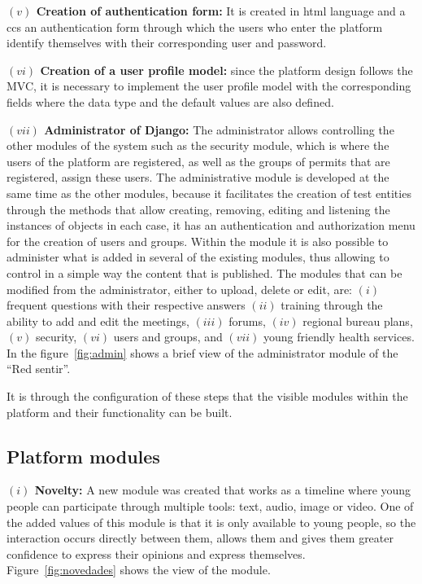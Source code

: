 \documentclass[journal,transmag]{IEEEtran}
\begin{document}
\textbf{$(v)$ Creation of authentication form:} It is created in html language and a ccs an authentication form through which the users who enter the platform identify themselves with their corresponding user and password.

\textbf{$(vi)$ Creation of a user profile model:} since the platform design follows the MVC, it is necessary to implement the user profile model with the corresponding fields where the data type and the default values are also defined.

\textbf{$(vii)$ Administrator of Django:} The administrator allows controlling the other modules of the system such as the security module, which is where the users of the platform are registered, as well as the groups of permits that are registered, assign these users. The administrative module is developed at the same time as the other modules, because it facilitates the creation of test entities through the methods that allow creating, removing, editing and listening the instances of objects in each case, it has an authentication and authorization menu for the creation of users and groups. Within the module it is also possible to administer what is added in several of the existing modules, thus allowing to control in a simple way the content that is published. The modules that can be modified from the administrator, either to upload, delete or edit, are: $(i)$ frequent questions with their respective answers $(ii)$ training through the ability to add and edit the meetings, $(iii)$ forums, $(iv)$ regional bureau plans, $(v)$ security, $(vi)$ users and groups, and $(vii)$ young friendly health services. In the figure~\ref{fig:admin} shows a brief view of the administrator module of the “Red sentir”.

It is through the configuration of these steps that the visible modules within the platform and their functionality can be built.

\subsection{Platform modules}

\textbf{$(i)$ Novelty:} A new module was created that works as a timeline where young people can participate through multiple tools: text, audio, image or video. One of the added values of this module is that it is only available to young people, so the interaction occurs directly between them, allows them and gives them greater confidence to express their opinions and express themselves. Figure~\ref{fig:novedades} shows the view of the module.
\end{document}
